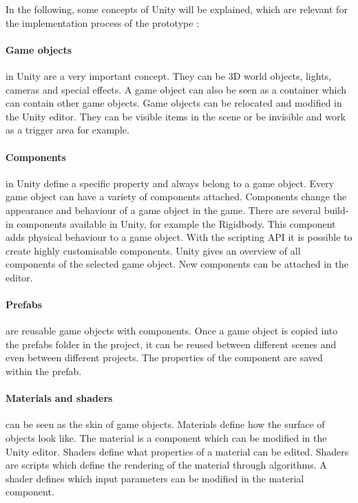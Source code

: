 In the following, some concepts of Unity will be explained, which are  relevant for the implementation process of the prototype \cite{unity.2019}:
\paragraph{Game objects} in Unity are a very important concept. They can be 3D world objects, lights, cameras and special effects. A game object can also be seen as a container which can contain other game objects. Game objects can be relocated and modified in the Unity editor. They can be visible items in the scene or be invisible and work as a trigger area for example.
\paragraph{Components} in Unity define a specific property and always belong to a game object. Every game object can have a variety of components attached. Components change the appearance and behaviour of a game object in the game. There are several build-in components available in Unity, for example the Rigidbody. This component adds physical behaviour to a game object. With the scripting API it is possible to create highly customisable components. Unity gives an overview of all components of the selected game object. New components can be attached in the editor.
\paragraph{Prefabs} are reusable game objects with components. Once a game object is copied into the prefabs folder in the project, it can be reused between different scenes and even between different projects. The properties of the component are saved within the prefab.
\paragraph{Materials and shaders} can be seen as the skin of game objects. Materials define how the surface of objects look like. The material is a component which can be modified in the Unity editor. Shaders define what properties of a material can be edited. Shaders are scripts which define the rendering of the material through algorithms. A shader defines which input parameters can be modified in the material component.

